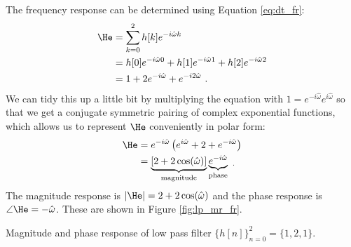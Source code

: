 The frequency response can be determined using Equation \ref{eq:dt_fr}:
\begin{align}
\He &= \sum_{k=0}^{2} h[k] e^{-i\hat{\omega}k}\\
    &= h[0]e^{-i\hat{\omega}0} + h[1]e^{-i\hat{\omega}1} + h[2]e^{-i\hat{\omega}2}\\
    &= 1 + 2 e^{-i\hat{\omega}} + e^{-i2\hat{\omega}} \,\,.
\end{align}
We can tidy this up a little bit by multiplying the equation with
$1=e^{-i\hat{\omega}}e^{i\hat{\omega}}$ so that we get a conjugate
symmetric pairing of complex exponential functions, which allows us to
represent $\He$ conveniently in polar form:
\begin{align}
\He &=  e^{-i\hat{\omega}}\left(e^{i\hat{\omega}} + 2 + e^{-i\hat{\omega}}\right)\\
    &= \underbrace{[2+2\cos(\hat{\omega})]}_{\mathrm{magnitude}}\underbrace{e^{-i\hat{\omega}}}_{\mathrm{phase}} \,\, _.
\end{align}
The magnitude response is $|\He|=2+2\cos(\hat{\omega})$ and the phase
response is $\angle \He = -\hat{\omega}$. These are shown in
Figure \ref{fig:lp_mr_fr}.
\begin{marginfigure}
\begin{center}
\end{center}
\caption{Magnitude and phase response of low pass filter $\{h[n]\}_{n=0}^{2} = \{1,2,1\}$.}
\label{fig:lp_mr_fr}
\end{marginfigure}

